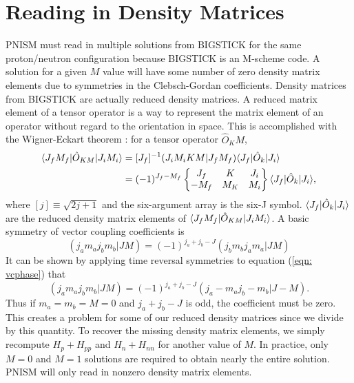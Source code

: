 \section{Reading in Density Matrices}
PNISM must read in multiple solutions from BIGSTICK for the same proton/neutron
configuration because BIGSTICK is an M-scheme code. A solution for a given $M$
value will have some number of zero density matrix elements due to 
symmetries in the Clebsch-Gordan coefficients. Density matrices from BIGSTICK
are actually reduced density matrices. A reduced matrix element of a tensor
operator is a way to represent the matrix element of an operator without regard
to the orientation in space. This is accomplished with the Wigner-Eckart theorem
\cite{Edmonds}: for a tensor operator $\hat{O}_KM$,
\begin{equation}\begin{split}\label{eqn: wigner}
    \langle J_fM_f|\hat{O}_{KM}|J_iM_i\rangle &= 
        [J_f]^{-1}(J_iM_iKM|J_fM_f)\langle J_f|\hat{O}_k|J_i\rangle \\
    &= (-1)^{J_f-M_f}\begin{Bmatrix} J_f & K & J_i \\ -M_f & M_K & M_i \end{Bmatrix}
        \langle J_f|\hat{O}_k|J_i\rangle,
\end{split}\end{equation}
where $[j] \equiv \sqrt{2j+1}$ and the six-argument array is the six-J symbol. 
$\langle J_f|\hat{O}_k|J_i\rangle$ are the reduced density matrix elements of 
$\langle J_fM_f|\hat{O}_{KM}|J_iM_i\rangle$.
A basic symmetry of vector coupling coefficients is\cite{Edmonds}
\begin{equation}\label{eqn: vcphase}
    (j_a m_a j_b m_b | J M) = (-1)^{j_a+j_b-J}(j_bm_bj_am_a|JM)
\end{equation}
It can be shown by applying time reversal symmetries to equation (\ref{eqn: vcphase})
that\cite{Edmonds}
\begin{equation}
    (j_a m_a j_b m_b | J M) = (-1)^{j_a+j_b-J}(j_a -m_a j_b -m_b | J -M).
\end{equation}
Thus if $m_a=m_b=M=0$ and $j_a+j_b-J$ is odd, the coefficient must be zero. This creates a problem for some
of
our reduced density matrices since we divide by this quantity. To recover the 
missing density matrix elements, we simply recompute $H_p + H_{pp}$ and $H_n + H_{nn}$
for another value of $M$. In practice, only $M=0$ and $M=1$ solutions are
required to obtain nearly the entire solution. PNISM will only read in nonzero
density matrix elements.

